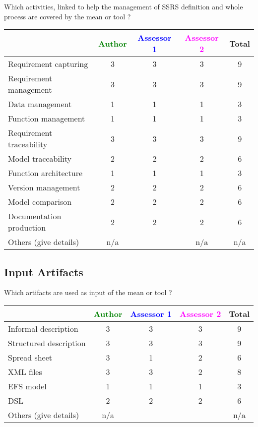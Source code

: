 Which activities, linked to help the management of SSRS definition and whole process are covered by the mean or tool  ?

\begin{tabular}{|l | c | c | c | c|}
\hline
& \textcolor{green}{Author} & \textcolor{blue}{Assessor 1} & \textcolor{magenta}{Assessor 2} & Total \\
\hline
Requirement capturing & 3 & 3 & 3 & 9 \\
\hline
Requirement management  & 3 & 3 & 3 & 9 \\
\hline
Data management & 1 & 1 & 1 & 3 \\
\hline
Function management & 1 & 1 & 1 & 3 \\
\hline
Requirement traceability  & 3 & 3 & 3 & 9 \\
\hline
Model traceability & 2 & 2 & 2 & 6 \\
\hline
Function architecture & 1 & 1 & 1 & 3 \\
\hline
Version management & 2 & 2 & 2 & 6 \\
\hline
Model comparison & 2 & 2 & 2 & 6 \\
\hline
Documentation production & 2 & 2 & 2 & 6 \\
\hline
Others (give details) & n/a & & n/a & n/a \\
\hline
\end{tabular}

\subsection{Input Artifacts}

Which artifacts are used as input of the mean or tool  ?


\begin{tabular}{|l | c | c | c | c|}
\hline
& \textcolor{green}{Author} & \textcolor{blue}{Assessor 1} & \textcolor{magenta}{Assessor 2} & Total \\
\hline
Informal description & 3 & 3 & 3 & 9 \\
\hline
Structured description & 3 & 3 & 3 & 9 \\
\hline
Spread sheet & 3 & 1 & 2 & 6 \\
\hline
XML files & 3 & 3 & 2 & 8 \\
\hline
EFS model & 1 & 1 & 1 & 3 \\
\hline
DSL & 2 & 2 & 2 & 6 \\
\hline
Others (give details) & n/a & & & n/a \\
\hline
\end{tabular}

